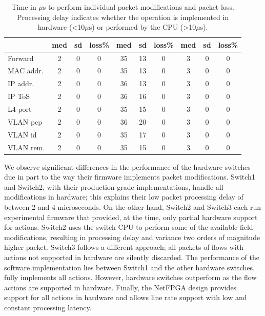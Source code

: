\begin{table}[tb]
\begin{tabular}[t]{|l | c | c | c || c | c | c || c | c | c |}
              & med & sd & loss\% & med & sd & loss\% & med & sd & loss\% \\ \hline  
    Forward   & 2   & 0  & 0      & 35  & 13 & 0      & 3   & 0  & 0      \\\hline  
    MAC addr. & 2   & 0  & 0      & 35  & 13 & 0      & 3   & 0  & 0      \\ \hline  
    IP addr.  & 2   & 0  & 0      & 36  & 13 & 0      & 3   & 0  & 0      \\ \hline  
    IP ToS    & 2   & 0  & 0      & 36  & 16 & 0      & 3   & 0  & 0      \\ \hline  
    L4 port   & 2   & 0  & 0      & 35  & 15 & 0      & 3   & 0  & 0      \\ \hline  
    VLAN pcp  & 2   & 0  & 0      & 36  & 20 & 0      & 3   & 0  & 0      \\ \hline  
    VLAN id   & 2   & 0  & 0      & 35  & 17 & 0      & 3   & 0  & 0      \\ \hline  
    VLAN rem. & 2   & 0  & 0      & 35  & 15 & 0      & 3   & 0  & 0      \\ \hline
  \end{tabular}
 
  \caption[Switch action latency.]{Time in $\mu$s to perform individual packet
    modifications and packet loss. Processing delay indicates whether the
    operation is implemented in hardware (\textless10$\mu$s) or performed by
    the CPU (\textgreater10$\mu$s).}
  \label{tbl:feature_delay}
\end{table}

We observe significant differences in the performance of the hardware switches
due in part to the way their firmware implements packet modifications. Switch1
and Switch2, with their production-grade implementations, handle all
modifications in hardware; this explains their low packet processing delay of
between 2 and 4 microseconds. On the other hand, Switch2 and Switch3 each run
experimental firmware that provided, at the time, only partial hardware support
for \of actions. Switch2 uses the switch CPU to perform some of the available
field modifications, resulting in processing delay and variance two orders of
magnitude higher packet.  Switch3 follows a different approach; all packets of
flows with actions not supported in hardware are silently discarded. The
performance of the \ovs software implementation lies between Switch1 and the
other hardware switches.  \ovs fully implements all \of actions. However,
hardware switches outperform \ovs as the flow actions are supported in
hardware. Finally, the NetFPGA design provides support for all actions in
hardware and allows line rate support with low and constant processing latency. 


